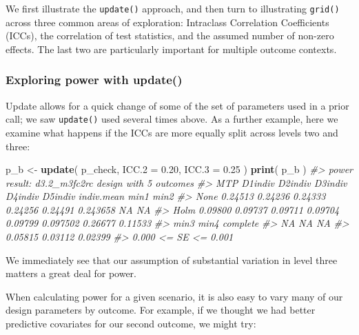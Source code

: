 \documentclass[
]{article}
\newenvironment{Shaded}{\begin{snugshade}}{\end{snugshade}}
\newcommand{\CommentTok}[1]{\textcolor[rgb]{0.56,0.35,0.01}{\textit{#1}}}
\newcommand{\DataTypeTok}[1]{\textcolor[rgb]{0.13,0.29,0.53}{#1}}
\newcommand{\FloatTok}[1]{\textcolor[rgb]{0.00,0.00,0.81}{#1}}
\newcommand{\KeywordTok}[1]{\textcolor[rgb]{0.13,0.29,0.53}{\textbf{#1}}}
\newcommand{\NormalTok}[1]{#1}
\newcommand{\StringTok}[1]{\textcolor[rgb]{0.31,0.60,0.02}{#1}}
\begin{document}
We first illustrate the \texttt{update()} approach, and then turn to
illustrating \texttt{grid()} across three common areas of exploration:
Intraclass Correlation Coefficients (ICCs), the correlation of test
statistics, and the assumed number of non-zero effects. The last two are
particularly important for multiple outcome contexts.

\subsubsection{Exploring power with update()}

Update allows for a quick change of some of the set of parameters used
in a prior call; we saw \texttt{update()} used several times above. As a
further example, here we examine what happens if the ICCs are more
equally split across levels two and three:

\begin{Shaded}
\begin{Highlighting}[]
\NormalTok{p\_b \textless{}{-}}\StringTok{ }\KeywordTok{update}\NormalTok{( p\_check, }\DataTypeTok{ICC.2 =} \FloatTok{0.20}\NormalTok{, }\DataTypeTok{ICC.3 =} \FloatTok{0.25}\NormalTok{ )}
\KeywordTok{print}\NormalTok{( p\_b )}
\CommentTok{\#\textgreater{} power result: d3.2\_m3fc2rc design with 5 outcomes}
\CommentTok{\#\textgreater{}   MTP D1indiv D2indiv D3indiv D4indiv D5indiv indiv.mean    min1    min2}
\CommentTok{\#\textgreater{}  None 0.24513 0.24236 0.24333 0.24256 0.24491   0.243658      NA      NA}
\CommentTok{\#\textgreater{}  Holm 0.09800 0.09737 0.09711 0.09704 0.09799   0.097502 0.26677 0.11533}
\CommentTok{\#\textgreater{}     min3    min4 complete}
\CommentTok{\#\textgreater{}       NA      NA       NA}
\CommentTok{\#\textgreater{}  0.05815 0.03112  0.02399}
\CommentTok{\#\textgreater{}  0.000 \textless{}= SE \textless{}= 0.001}
\end{Highlighting}
\end{Shaded}

We immediately see that our assumption of substantial variation in level
three matters a great deal for power.

When calculating power for a given scenario, it is also easy to vary
many of our design parameters by outcome. For example, if we thought we
had better predictive covariates for our second outcome, we might try:
\end{document}
